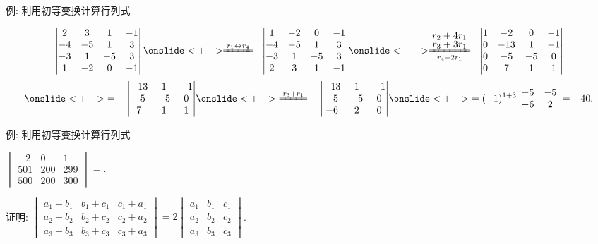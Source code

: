 \begin{frame}{例: 利用初等变换计算行列式}
	\onslide<+->
	\begin{example}
		\[\begin{vmatrix}
			 2& 3& 1&-1\\
			-4&-5& 1& 3\\
			-3& 1&-5& 3\\
			 1&-2& 0&-1
		\end{vmatrix}
		\onslide<+->{\!\!\xeq{r_1\swap r_4}\!\!
		-\begin{vmatrix}
			1&-2& 0&-1\\
		 -4&-5& 1& 3\\
		 -3& 1&-5& 3\\
		  2& 3& 1&-1
		\end{vmatrix}}
		\onslide<+->{\!\!\xeq[r_4-2r_1]{\substack{\nsmath{r_2+4r_1}\\\nsmath{r_3+3r_1}}}\!\!
		-\begin{vmatrix}
			1&-2& 0&-1\\
		  0&-13& 1&-1\\
		  0&-5&-5&0\\
		  0& 7& 1&1
		\end{vmatrix}}\]
		\[\onslide<+->{=-\begin{vmatrix}
			-13& 1&-1\\
			-5&-5&0\\
				7& 1&1
			\end{vmatrix}}
		\onslide<+->{\xeq{r_3+r_1}
		-\begin{vmatrix}
			-13& 1&-1\\
			-5&-5&0\\
			-6& 2&0
		\end{vmatrix}}
		\onslide<+->{=(-1)^{1+3}\begin{vmatrix}
			-5&-5\\-6&2
		\end{vmatrix}=-40.}\]
	\end{example}
\end{frame}


\begin{frame}{例: 利用初等变换计算行列式}
	\onslide<+->
	\begin{exercise}
		$\begin{vmatrix}
			-2&0&1\\
			501&200&299\\
			500&200&300
		\end{vmatrix}=$.
	\end{exercise}
	\onslide<+->
	\begin{example}
		证明:
		$\begin{vmatrix}
			a_1+b_1&b_1+c_1&c_1+a_1\\
			a_2+b_2&b_2+c_2&c_2+a_2\\
			a_3+b_3&b_3+c_3&c_3+a_3
		\end{vmatrix}=2\begin{vmatrix}
			a_1&b_1&c_1\\
			a_2&b_2&c_2\\
			a_3&b_3&c_3
		\end{vmatrix}$.
	\end{example}
\end{frame}


